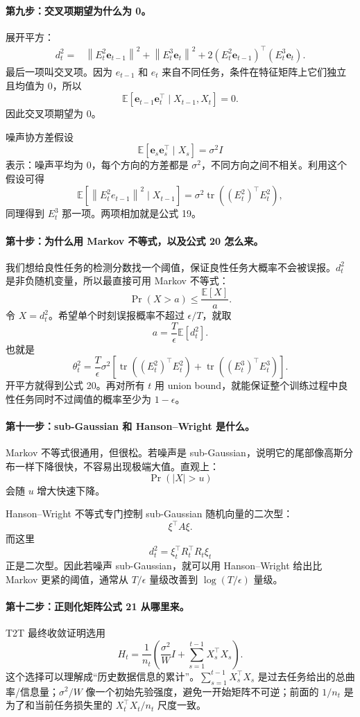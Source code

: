 \documentclass[UTF8,fontset=none,11pt]{ctexart}
\theoremstyle{cnstyle}
\newcommand{\E}{\mathbb{E}}
\newcommand{\tr}{\operatorname{tr}}
\newcommand{\norm}[1]{\left\lVert #1\right\rVert}
\begin{document}
\paragraph{第九步：交叉项期望为什么为 0。}
展开平方：
\begin{align*}
  d_t^2
  =&
  \norm{E_t^2\mathbf e_{t-1}}^2
  +\norm{E_t^3\mathbf e_t}^2
  +2(E_t^2\mathbf e_{t-1})^\top(E_t^3\mathbf e_t).
\end{align*}
最后一项叫交叉项。因为 \(e_{t-1}\) 和 \(e_t\) 来自不同任务，条件在特征矩阵上它们独立且均值为 0，所以
\[
  \E[\mathbf e_{t-1}\mathbf e_t^\top\mid X_{t-1},X_t]=0.
\]
因此交叉项期望为 0。

噪声协方差假设
\[
  \E[\mathbf e_s\mathbf e_s^\top\mid X_s]=\sigma^2I
\]
表示：噪声平均为 0，每个方向的方差都是 \(\sigma^2\)，不同方向之间不相关。利用这个假设可得
\[
  \E[\norm{E_t^2e_{t-1}}^2\mid X_{t-1}]
  =
  \sigma^2\tr((E_t^2)^\top E_t^2),
\]
同理得到 \(E_t^3\) 那一项。两项相加就是公式 19。

\paragraph{第十步：为什么用 Markov 不等式，以及公式 20 怎么来。}
我们想给良性任务的检测分数找一个阈值，保证良性任务大概率不会被误报。\(d_t^2\) 是非负随机变量，所以最直接可用 Markov 不等式：
\[
  \Pr(X>a)\le\frac{\E[X]}{a}.
\]
令 \(X=d_t^2\)。希望单个时刻误报概率不超过 \(\epsilon/T\)，就取
\[
  a=\frac{T}{\epsilon}\E[d_t^2].
\]
也就是
\[
  \theta_t^2
  =
  \frac{T}{\epsilon}
  \sigma^2
  \left[
  \tr((E_t^2)^\top E_t^2)
  +
  \tr((E_t^3)^\top E_t^3)
  \right].
\]
开平方就得到公式 20。再对所有 \(t\) 用 union bound，就能保证整个训练过程中良性任务同时不过阈值的概率至少为 \(1-\epsilon\)。

\paragraph{第十一步：sub-Gaussian 和 Hanson--Wright 是什么。}
Markov 不等式很通用，但很松。若噪声是 sub-Gaussian，说明它的尾部像高斯分布一样下降很快，不容易出现极端大值。直观上：
\[
  \Pr(|X|>u)
\]
会随 \(u\) 增大快速下降。

Hanson--Wright 不等式专门控制 sub-Gaussian 随机向量的二次型：
\[
  \xi^\top A\xi.
\]
而这里
\[
  d_t^2
  =
  \xi_t^\top R_t^\top R_t\xi_t
\]
正是二次型。因此若噪声 sub-Gaussian，就可以用 Hanson--Wright 给出比 Markov 更紧的阈值，通常从 \(T/\epsilon\) 量级改善到 \(\log(T/\epsilon)\) 量级。

\paragraph{第十二步：正则化矩阵公式 21 从哪里来。}
T2T 最终收敛证明选用
\[
  H_t=\frac1{n_t}
  \left(
  \frac{\sigma^2}{W}I+\sum_{s=1}^{t-1}X_s^\top X_s
  \right).
\]
这个选择可以理解成“历史数据信息的累计”。\(\sum_{s=1}^{t-1}X_s^\top X_s\) 是过去任务给出的总曲率/信息量；\(\sigma^2/W\) 像一个初始先验强度，避免一开始矩阵不可逆；前面的 \(1/n_t\) 是为了和当前任务损失里的 \(X_t^\top X_t/n_t\) 尺度一致。
\end{document}
